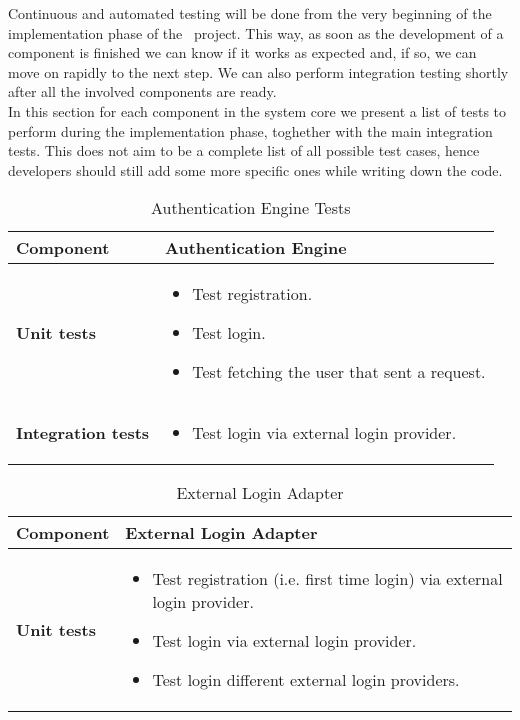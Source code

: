 Continuous and automated testing will be done from the very beginning of the implementation phase of the \projectname~project. This way, as soon as the development of a component is finished we can know if it works as expected and, if so, we can move on rapidly to the next step. We can also perform integration testing shortly after all the involved components are ready. \\
In this section for each component in the system core we present a list of tests to perform during the implementation phase, toghether with the main integration tests. This does not aim to be a complete list of all possible test cases, hence developers should still add some more specific ones while writing down the code. \\

\begin{table}[h]	
	\centering
	\def\arraystretch{1.5}
	\begin{tabular}{|m{4cm}|m{12cm}|}
		\hline
		\textbf{Component} & Authentication Engine \\ \hline
		\textbf{Unit tests} & 
			\begin{itemize}
			\item Test registration.
			\item Test login.
			\item Test fetching the user that sent a request.
			\end{itemize} \\ \hline
		\textbf{Integration tests} &
			\begin{itemize} 
			\item Test login via external login provider. 
			\end{itemize} \\ \hline
	\end{tabular}
	\caption{Authentication Engine Tests}
\end{table}

\begin{table}[h]	
	\centering
	\def\arraystretch{1.5}
	\begin{tabular}{|m{4cm}|m{12cm}|}
		\hline
		\textbf{Component} & External Login Adapter \\ \hline
		\textbf{Unit tests} & 
			\begin{itemize}
			\item Test registration (i.e. first time login) via external login provider.
			\item Test login via external login provider.
			\item Test login different external login providers.
			\end{itemize} \\ \hline
	\end{tabular}
	\caption{External Login Adapter}
\end{table}

